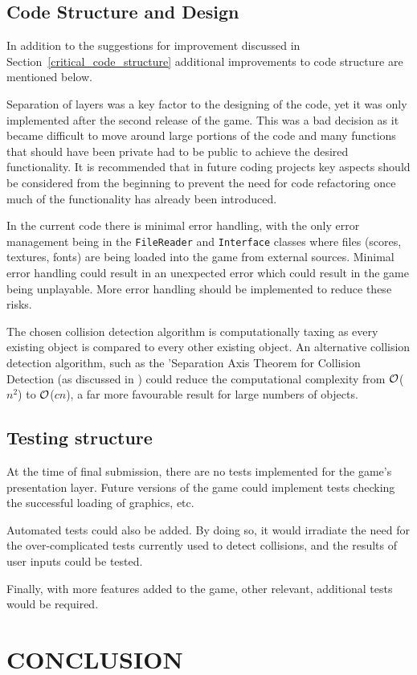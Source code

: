 \documentclass[10pt,twocolumn]{witseiepaper}
\begin{document}
\subsection{Code Structure and Design}\label{code_improvements}

In addition to the suggestions for improvement discussed in Section~\ref{critical_code_structure} additional improvements to code structure are mentioned below.

Separation of layers was a key factor to the designing of the code, yet it was only implemented after the second release of the game. This was a bad decision as it became difficult to move around large portions of the code and many functions that should have been private had to be public to achieve the desired functionality. It is recommended that in future coding projects key aspects should be considered from the beginning to prevent the need for code refactoring once much of the functionality has already been introduced.

In the current code there is minimal error handling, with the only error management being in the \texttt{FileReader} and \texttt{Interface} classes where files (scores, textures, fonts) are being loaded into the game from external sources. Minimal error handling could result in an unexpected error which could result in the game being unplayable. More error handling should be implemented to reduce these risks.

The chosen collision detection algorithm is computationally taxing as every existing object is compared to every other existing object. An alternative collision detection algorithm, such as the 'Separation Axis Theorem for Collision Detection (as discussed in \cite{Collision_detection}) could reduce the computational complexity from $\cal{O}$($n^{2}$) to $\cal{O}$($cn$), a far more favourable result for large numbers of objects.


\subsection{Testing structure}
At the time of final submission, there are no tests implemented for the game's presentation layer. Future versions of the game could implement tests checking the successful loading of graphics, etc.

Automated tests could also be added. By doing so, it would irradiate the need for the over-complicated tests currently used to detect collisions, and the results of user inputs could be tested.

Finally, with more features added to the game, other relevant, additional tests would be required.


\section{CONCLUSION}

%



\end{document}
